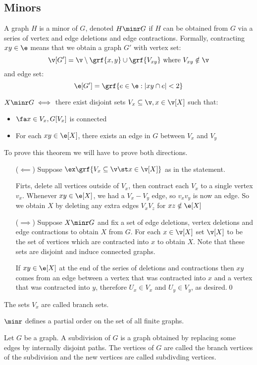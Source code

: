 \subsection{Minors}
A graph $H$ is a minor of $G$, denoted $H \minr G$ if $H$ can be obtained from $G$ via a series of vertex and edge deletions and edge contractions. Formally, contracting $xy \in \e$ means that we obtain a graph $G'$ with vertex set:
\begin{equation*}
    \v[G'] = \v \setminus \grf{x, y} \cup \grf{V_{xy}} \text{ where } V_{xy} \notin \v
\end{equation*}
and edge set:
\begin{equation*}
    \e[G'] = \grf{e \in \e: |xy \cap e| < 2}
\end{equation*}
\begin{customproposition}{1.25}
    \label{proposition:1.25}
    $X \minr G \iff$ there exist disjoint sets $V_x \subseteq \v, x \in \v[X]$ such that:
    \begin{itemize}
        \item $\fa x \in V_x, G[V_x]$ is connected
        \item For each $xy \in \e[X]$, there exists an edge in $G$ between $V_x$ and $V_y$
    \end{itemize}
\end{customproposition}
\begin{prf}
    To prove this theorem we will have to prove both directions.
    \begin{itemize}
        \item [($\impliedby$)] Suppose $\ex \grf{V_x \subseteq \v \st x \in \v[X]}$ as in the statement.
        
        Firts, delete all vertices outside of $V_x$, then contract each $V_x$ to a single vertex $v_x$. Whenever $xy \in \e[X]$, we had a $V_x - V_y$ edge, so $v_xv_y$ is now an edge. So we obtain $X$ by deleting any extra edges $V_xV_z$ for $xz \notin \e[X]$
        \item [($\implies$)] Suppose $X \minr G$ and fix a set of edge deletions, vertex deletions and edge contractions to obtain $X$ from $G$. For each $x \in \v[X]$ set $\v[X]$ to be the set of vertices which are contracted into $x$ to obtain $X$. Note that these sets are disjoint and induce connected graphs.
        
        If $xy \in \e[X]$ at the end of the series of deletions and contractions then $xy$ comes from an edge between a vertex that was contracted into $x$ and a vertex that was contracted into $y$, therefore $U_x \in V_x$ and $U_y \in V_y$, as desired.\qed
    \end{itemize}
\end{prf}
The sets $V_x$ are called branch sets.
\begin{customproposition}{1.26}
    \label{proposition:1.26}
    $\minr$ defines a partial order on the set of all finite graphs.
\end{customproposition}
Let $G$ be a graph. A subdivision of $G$ is a graph obtained by replacing some edges by internally disjoint paths. The vertices of $G$ are called the branch vertices of the subdivision and the new vertices are called subdivding vertices.

